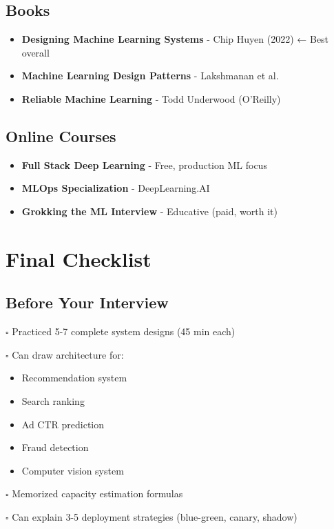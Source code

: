 \documentclass[10pt]{article}
\begin{document}
\subsection{Books}

\begin{itemize}
\item \textbf{Designing Machine Learning Systems} - Chip Huyen (2022) ← Best overall
\item \textbf{Machine Learning Design Patterns} - Lakshmanan et al.
\item \textbf{Reliable Machine Learning} - Todd Underwood (O'Reilly)
\end{itemize}

\subsection{Online Courses}

\begin{itemize}
\item \textbf{Full Stack Deep Learning} - Free, production ML focus
\item \textbf{MLOps Specialization} - DeepLearning.AI
\item \textbf{Grokking the ML Interview} - Educative (paid, worth it)
\end{itemize}

\section{Final Checklist}

\subsection{Before Your Interview}

$\square$ Practiced 5-7 complete system designs (45 min each)

$\square$ Can draw architecture for:
\begin{itemize}
\item Recommendation system
\item Search ranking
\item Ad CTR prediction
\item Fraud detection
\item Computer vision system
\end{itemize}

$\square$ Memorized capacity estimation formulas

$\square$ Can explain 3-5 deployment strategies (blue-green, canary, shadow)
\end{document}
